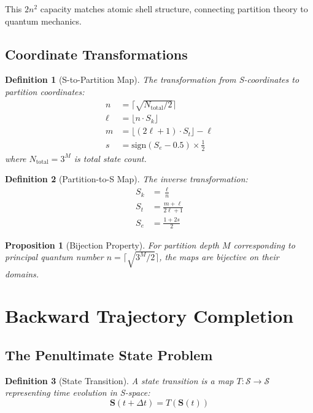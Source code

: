 \documentclass[twocolumn,10pt]{article}
\newtheorem{proposition}[theorem]{Proposition}
\newtheorem{definition}{Definition}
\begin{document}
This $2n^2$ capacity matches atomic shell structure, connecting partition theory to quantum mechanics.

\subsection{Coordinate Transformations}

\begin{definition}[S-to-Partition Map]
The transformation from S-coordinates to partition coordinates:
\begin{align}
n &= \lceil \sqrt{N_{\text{total}}/2} \rceil \\
\ell &= \lfloor n \cdot S_k \rfloor \\
m &= \lfloor (2\ell + 1) \cdot S_t \rfloor - \ell \\
s &= \text{sign}(S_e - 0.5) \times \frac{1}{2}
\end{align}
where $N_{\text{total}} = 3^M$ is total state count.
\end{definition}

\begin{definition}[Partition-to-S Map]
The inverse transformation:
\begin{align}
S_k &= \frac{\ell}{n} \\
S_t &= \frac{m + \ell}{2\ell + 1} \\
S_e &= \frac{1 + 2s}{2}
\end{align}
\end{definition}

\begin{proposition}[Bijection Property]
For partition depth $M$ corresponding to principal quantum number $n = \lceil\sqrt{3^M/2}\rceil$, the maps are bijective on their domains.
\end{proposition}

\section{Backward Trajectory Completion}

\subsection{The Penultimate State Problem}

\begin{definition}[State Transition]
A state transition is a map $T: \mathcal{S} \to \mathcal{S}$ representing time evolution in S-space:
\begin{equation}
\mathbf{S}(t + \Delta t) = T(\mathbf{S}(t))
\end{equation}
\end{definition}
\end{document}
